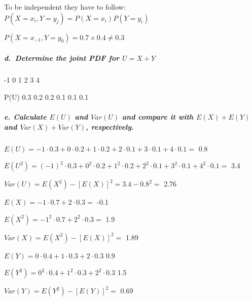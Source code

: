 \documentclass[
]{article}
\begin{document}
To be independent they have to follow:
\(P(X = x_i, Y = y_j) = P(X=x_i)P(Y = y_i)\)

\(P(X=x_{-1}, Y = y_0) = 0.7 \times 0.4 \neq 0.3\)

\hypertarget{d.-determine-the-joint-pdf-for-u-x-y}{%
\subparagraph{\texorpdfstring{d.~Determine the joint PDF for
\(U = X + Y\)}{d.~Determine the joint PDF for U = X + Y}}\label{d.-determine-the-joint-pdf-for-u-x-y}}

-1 \textbar{} 0 \textbar{} 1 \textbar{} 2 \textbar{} 3 \textbar{} 4

P(U) \textbar{} 0.3 \textbar{} 0.2 \textbar{} 0.2 \textbar{} 0.1
\textbar{} 0.1 \textbar{} 0.1

\hypertarget{e.-calculate-eu-and-varu-and-compare-it-with-ex-ey-and-varx-vary-respectively.}{%
\subparagraph{\texorpdfstring{e. Calculate \(E(U)\) and \(Var(U)\) and
compare it with \(E(X) + E(Y)\) and \(Var(X) + Var(Y)\),
respectively.}{e. Calculate E(U) and Var(U) and compare it with E(X) + E(Y) and Var(X) + Var(Y), respectively.}}\label{e.-calculate-eu-and-varu-and-compare-it-with-ex-ey-and-varx-vary-respectively.}}

\(E(U)= -1 \cdot 0.3 + 0 \cdot 0.2 + 1 \cdot 0.2 + 2 \cdot 0.1 + 3 \cdot 0.1 + 4 \cdot 0.1 =\)
0.8

\(E(U^2) = (-1)^2 \cdot 0.3 + 0^2 \cdot 0.2 + 1^2 \cdot 0.2 + 2^2 \cdot 0.1 + 3^2 \cdot 0.1 + 4^2 \cdot 0.1 =\)
3.4

\(Var(U) = E(X^2)-[E(X)]^2 = 3.4 - 0.8^2 =\) 2.76

\(E(X) = - 1 \cdot 0.7 + 2 \cdot 0.3 =\) -0.1

\(E(X^2) = - 1^2 \cdot 0.7 + 2^2 \cdot 0.3 =\) 1.9

\(Var(X) = E(X^2)-[E(X)]^2 =\) 1.89

\(E(Y) = 0 \cdot 0.4 + 1 \cdot 0.3 + 2 \cdot 0.3\) 0.9

\(E(Y^2) = 0^2 \cdot 0.4 + 1^2 \cdot 0.3 + 2^2 \cdot 0.3\) 1.5

\(Var(Y) = E(Y^2)-[E(Y)]^2 =\) 0.69
\end{document}
